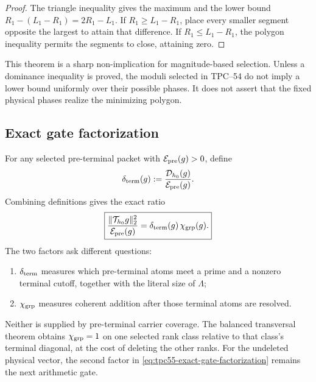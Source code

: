 \begin{proof}
The triangle inequality gives the maximum and the lower bound
\(R_1-(L_1-R_1)=2R_1-L_1\).  If \(R_1\ge L_1-R_1\), place every smaller
segment opposite the largest to attain that difference.  If
\(R_1\le L_1-R_1\), the polygon inequality permits the segments to close,
attaining zero.
\end{proof}

This theorem is a sharp non-implication for magnitude-based selection.
Unless a dominance inequality is proved, the moduli selected in TPC--54
do not imply a lower bound uniformly over their possible phases.  It does
not assert that the fixed physical phases realize the minimizing polygon.

\subsection{Exact gate factorization}

For any selected pre-terminal packet with \(\mathcal E_{\rm pre}(g)>0\), define
\begin{equation}
 \delta_{\rm term}(g)
 :=\frac{\mathcal D_{h_0}(g)}{\mathcal E_{\rm pre}(g)}.
 \label{eq:tpc55-terminal-activation-ratio}
\end{equation}
Combining definitions gives the exact ratio
\begin{equation}
 \boxed{
 \frac{\|\mathcal T_{h_0}g\|_2^2}{\mathcal E_{\rm pre}(g)}
 =\delta_{\rm term}(g)\,\chi_{\rm grp}(g).}
 \label{eq:tpc55-exact-gate-factorization}
\end{equation}
The two factors ask different questions:
\begin{enumerate}[label=\textup{(\roman*)},leftmargin=3em]
 \item \(\delta_{\rm term}\) measures which pre-terminal atoms meet a
       prime and a nonzero terminal cutoff, together with the literal size
       of \(\Lambda\);
 \item \(\chi_{\rm grp}\) measures coherent addition after those terminal
       atoms are resolved.
\end{enumerate}
Neither is supplied by pre-terminal carrier coverage.  The balanced
transversal theorem obtains \(\chi_{\rm grp}=1\) on one selected rank
class relative to that class's terminal diagonal, at the cost of deleting
the other ranks.  For the undeleted physical vector, the second factor in
\eqref{eq:tpc55-exact-gate-factorization} remains the next arithmetic gate.
